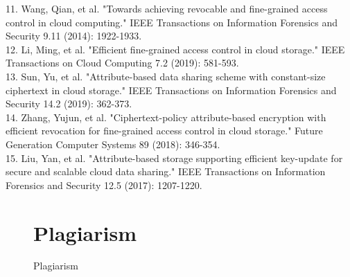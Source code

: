 11. Wang, Qian, et al. "Towards achieving revocable and fine-grained access control in cloud
computing." IEEE Transactions on Information Forensics and Security 9.11 (2014): 1922-1933.\\
12. Li, Ming, et al. "Efficient fine-grained access control in cloud storage." IEEE Transactions on
Cloud Computing 7.2 (2019): 581-593. \\
13. Sun, Yu, et al. "Attribute-based data sharing scheme with constant-size ciphertext in cloud
storage." IEEE Transactions on Information Forensics and Security 14.2 (2019): 362-373.\\
14. Zhang, Yujun, et al. "Ciphertext-policy attribute-based encryption with efficient revocation for
fine-grained access control in cloud storage." Future Generation Computer Systems 89 (2018):
346-354.\\
15. Liu, Yan, et al. "Attribute-based storage supporting efficient key-update for secure and scalable
cloud data sharing." IEEE Transactions on Information Forensics and Security 12.5 (2017):
1207-1220.

\begin{figure}[h]
\section{Plagiarism}
  \centering
  \caption{Plagiarism}
\end{figure}


